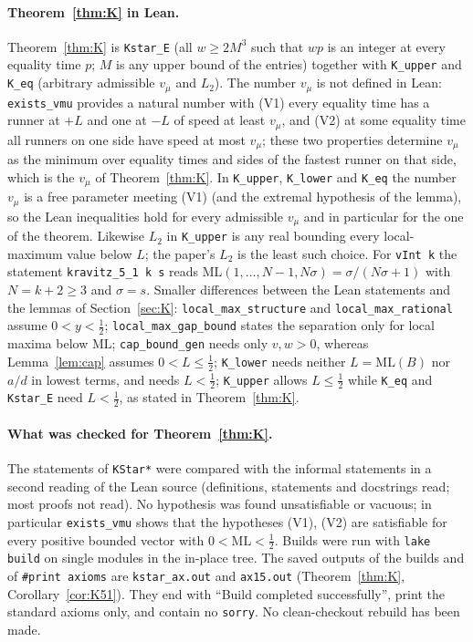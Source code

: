 \documentclass[11pt]{article}
\theoremstyle{definition}
\theoremstyle{remark}
\newcommand{\ML}{\mathrm{ML}}
\begin{document}
\paragraph{Theorem~\ref{thm:K} in Lean.}
Theorem~\ref{thm:K} is \texttt{Kstar\_E} (all $w\ge2M^3$ such that $wp$ is an integer at every equality time $p$; $M$ is any upper bound of the entries) together with \texttt{K\_upper} and \texttt{K\_eq} (arbitrary admissible $v_\mu$ and $L_2$). The number $v_\mu$ is not defined in Lean: \texttt{exists\_vmu} provides a natural number with (V1) every equality time has a runner at $+L$ and one at $-L$ of speed at least $v_\mu$, and (V2) at some equality time all runners on one side have speed at most $v_\mu$; these two properties determine $v_\mu$ as the minimum over equality times and sides of the fastest runner on that side, which is the $v_\mu$ of Theorem~\ref{thm:K}. In \texttt{K\_upper}, \texttt{K\_lower} and \texttt{K\_eq} the number $v_\mu$ is a free parameter meeting (V1) (and the extremal hypothesis of the lemma), so the Lean inequalities hold for every admissible $v_\mu$ and in particular for the one of the theorem. Likewise $L_2$ in \texttt{K\_upper} is any real bounding every local-maximum value below $L$; the paper's $L_2$ is the least such choice. For \texttt{vInt k} the statement \texttt{kravitz\_5\_1 k s} reads $\ML(1,\dots,N-1,N\sigma)=\sigma/(N\sigma+1)$ with $N=k+2\ge3$ and $\sigma=s$. Smaller differences between the Lean statements and the lemmas of Section~\ref{sec:K}: \texttt{local\_max\_structure} and \texttt{local\_max\_rational} assume $0<y<\frac12$; \texttt{local\_max\_gap\_bound} states the separation only for local maxima below $\ML$; \texttt{cap\_bound\_gen} needs only $v,w>0$, whereas Lemma~\ref{lem:cap} assumes $0<L\le\frac12$; \texttt{K\_lower} needs neither $L=\ML(B)$ nor $a/d$ in lowest terms, and needs $L<\frac12$; \texttt{K\_upper} allows $L\le\frac12$ while \texttt{K\_eq} and \texttt{Kstar\_E} need $L<\frac12$, as stated in Theorem~\ref{thm:K}.

\paragraph{What was checked for Theorem~\ref{thm:K}.}
The statements of \texttt{KStar*} were compared with the informal statements in a second reading of the Lean source (definitions, statements and docstrings read; most proofs not read). No hypothesis was found unsatisfiable or vacuous; in particular \texttt{exists\_vmu} shows that the hypotheses (V1), (V2) are satisfiable for every positive bounded vector with $0<\ML<\frac12$. Builds were run with \texttt{lake build} on single modules in the in-place tree. The saved outputs of the builds and of \texttt{\#print axioms} are \texttt{kstar\_ax.out} and \texttt{ax15.out} (Theorem~\ref{thm:K}, Corollary~\ref{cor:K51}). They end with ``Build completed successfully'', print the standard axioms only, and contain no \texttt{sorry}. No clean-checkout rebuild has been made.
\end{document}
